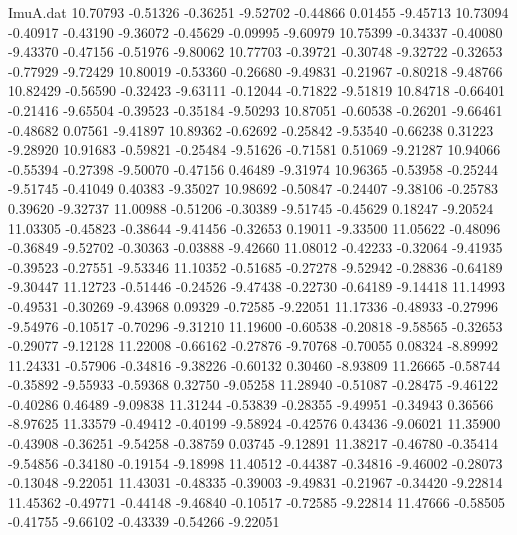 \begin{filecontents}{ImuA.dat}
  10.70793   -0.51326   -0.36251   -9.52702   -0.44866    0.01455   -9.45713
  10.73094   -0.40917   -0.43190   -9.36072   -0.45629   -0.09995   -9.60979
  10.75399   -0.34337   -0.40080   -9.43370   -0.47156   -0.51976   -9.80062
  10.77703   -0.39721   -0.30748   -9.32722   -0.32653   -0.77929   -9.72429
  10.80019   -0.53360   -0.26680   -9.49831   -0.21967   -0.80218   -9.48766
  10.82429   -0.56590   -0.32423   -9.63111   -0.12044   -0.71822   -9.51819
  10.84718   -0.66401   -0.21416   -9.65504   -0.39523   -0.35184   -9.50293
  10.87051   -0.60538   -0.26201   -9.66461   -0.48682    0.07561   -9.41897
  10.89362   -0.62692   -0.25842   -9.53540   -0.66238    0.31223   -9.28920
  10.91683   -0.59821   -0.25484   -9.51626   -0.71581    0.51069   -9.21287
  10.94066   -0.55394   -0.27398   -9.50070   -0.47156    0.46489   -9.31974
  10.96365   -0.53958   -0.25244   -9.51745   -0.41049    0.40383   -9.35027
  10.98692   -0.50847   -0.24407   -9.38106   -0.25783    0.39620   -9.32737
  11.00988   -0.51206   -0.30389   -9.51745   -0.45629    0.18247   -9.20524
  11.03305   -0.45823   -0.38644   -9.41456   -0.32653    0.19011   -9.33500
  11.05622   -0.48096   -0.36849   -9.52702   -0.30363   -0.03888   -9.42660
  11.08012   -0.42233   -0.32064   -9.41935   -0.39523   -0.27551   -9.53346
  11.10352   -0.51685   -0.27278   -9.52942   -0.28836   -0.64189   -9.30447
  11.12723   -0.51446   -0.24526   -9.47438   -0.22730   -0.64189   -9.14418
  11.14993   -0.49531   -0.30269   -9.43968    0.09329   -0.72585   -9.22051
  11.17336   -0.48933   -0.27996   -9.54976   -0.10517   -0.70296   -9.31210
  11.19600   -0.60538   -0.20818   -9.58565   -0.32653   -0.29077   -9.12128
  11.22008   -0.66162   -0.27876   -9.70768   -0.70055    0.08324   -8.89992
  11.24331   -0.57906   -0.34816   -9.38226   -0.60132    0.30460   -8.93809
  11.26665   -0.58744   -0.35892   -9.55933   -0.59368    0.32750   -9.05258
  11.28940   -0.51087   -0.28475   -9.46122   -0.40286    0.46489   -9.09838
  11.31244   -0.53839   -0.28355   -9.49951   -0.34943    0.36566   -8.97625
  11.33579   -0.49412   -0.40199   -9.58924   -0.42576    0.43436   -9.06021
  11.35900   -0.43908   -0.36251   -9.54258   -0.38759    0.03745   -9.12891
  11.38217   -0.46780   -0.35414   -9.54856   -0.34180   -0.19154   -9.18998
  11.40512   -0.44387   -0.34816   -9.46002   -0.28073   -0.13048   -9.22051
  11.43031   -0.48335   -0.39003   -9.49831   -0.21967   -0.34420   -9.22814
  11.45362   -0.49771   -0.44148   -9.46840   -0.10517   -0.72585   -9.22814
  11.47666   -0.58505   -0.41755   -9.66102   -0.43339   -0.54266   -9.22051

\end{filecontents}
